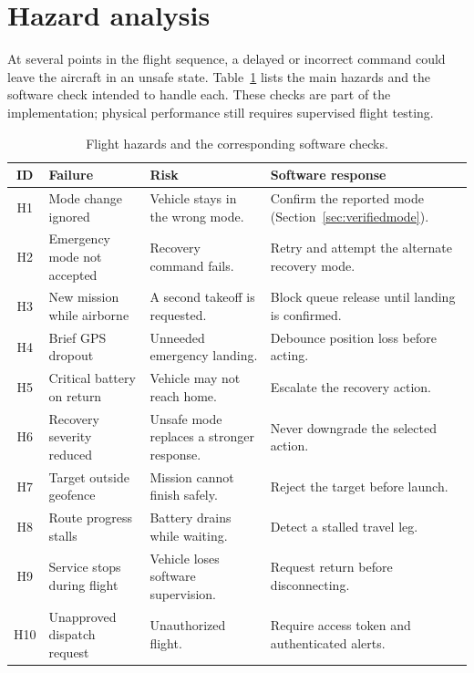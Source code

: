 \documentclass[12pt,a4paper]{report}
\begin{document}
\section{Hazard analysis}
\label{sec:hazards}

At several points in the flight sequence, a delayed or incorrect
command could leave the aircraft in an unsafe state. Table~\ref{tab:hazards}
lists the main hazards and the software check intended to handle each.
These checks are part of the implementation; physical performance
still requires supervised flight testing.

\begin{table}[htbp]
\centering
\caption{Flight hazards and the corresponding software checks.}
\label{tab:hazards}
\renewcommand{\arraystretch}{1.12}
\begin{tabular}{|c|>{\raggedright\arraybackslash}p{}|>{\raggedright\arraybackslash}p{}|>{\raggedright\arraybackslash}p{}|}
\hline
\textbf{ID} & \textbf{Failure} & \textbf{Risk} & \textbf{Software response} \\\hline
H1 & Mode change ignored & Vehicle stays in the wrong mode. & Confirm the reported mode (Section~\ref{sec:verifiedmode}). \\\hline
H2 & Emergency mode not accepted & Recovery command fails. & Retry and attempt the alternate recovery mode. \\\hline
H3 & New mission while airborne & A second takeoff is requested. & Block queue release until landing is confirmed. \\\hline
H4 & Brief GPS dropout & Unneeded emergency landing. & Debounce position loss before acting. \\\hline
H5 & Critical battery on return & Vehicle may not reach home. & Escalate the recovery action. \\\hline
H6 & Recovery severity reduced & Unsafe mode replaces a stronger response. & Never downgrade the selected action. \\\hline
H7 & Target outside geofence & Mission cannot finish safely. & Reject the target before launch. \\\hline
H8 & Route progress stalls & Battery drains while waiting. & Detect a stalled travel leg. \\\hline
H9 & Service stops during flight & Vehicle loses software supervision. & Request return before disconnecting. \\\hline
H10 & Unapproved dispatch request & Unauthorized flight. & Require access token and authenticated alerts. \\\hline
\end{tabular}
\end{table}
\end{document}
